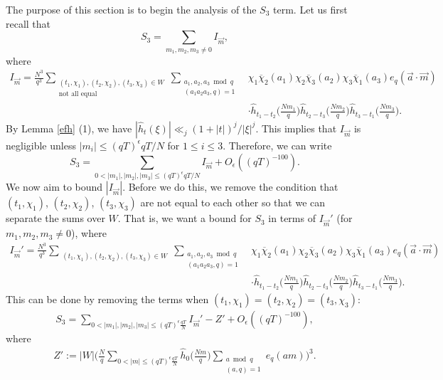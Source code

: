 \documentclass[12pt]{amsart}
\theoremstyle{definition}
\theoremstyle{plain}
\theoremstyle{remark}
\numberwithin{equation}{section}
\numberwithin{theorem}{section}
\numberwithin{equation}{section}
\begin{document}
	The purpose of this section is to begin the analysis of the $S_{3}$ term. Let us first recall that 
	\[S_{3}=\sum_{m_{1}, m_{2}, m_{3}\neq 0}I_{\overrightarrow{m}},\]
	where
	\begin{align*}I_{\overrightarrow{m}}=\frac{N^{3}}{q^{3}}\sum_{\substack{(t_1,\chi_1),(t_2,\chi_2),(t_3,\chi_3) \in W \\ \text{not all equal}}}\sum_{\substack{a_1,a_2,a_3 \bmod q \\ (a_1a_2a_3,q)=1}}&\chi_{1}\overline{\chi}_{2}(a_{1})
		\chi_{2}\overline{\chi}_{3}(a_{2})
		\chi_{3}\overline{\chi}_{1}(a_{3})
		e_q(\overrightarrow{a}\cdot\overrightarrow{m})
		\\
		&\cdot \hat{h}_{t_{1}-t_{2}}\bigg(\frac{Nm_{1}}{q}\bigg)\hat{h}_{t_{2}-t_{3}}\bigg(\frac{Nm_{2}}{q}\bigg)\hat{h}_{t_{3}-t_{1}}\bigg(\frac{Nm_{3}}{q}\bigg).
	\end{align*}
	By Lemma \ref{efh} (1), we have $|\hat{h}_{t}(\xi)|\ll_{j}(1+|t|)^{j}/|\xi|^{j}$. This implies that $I_{\overrightarrow{m}}$ is negligible unless $|m_{i}|\leq (qT)^{\epsilon}qT/N$ for $1\leq i \leq 3$. Therefore, we can write
	\[
	S_{3}=\sum_{0<|m_{1}|, |m_{2}|, |m_{3}|\leq (qT)^{\epsilon}qT/N}I_{\overrightarrow{m}}+O_{\epsilon}((qT)^{-100}).
	\]
	We now aim to bound $|I_{\overrightarrow{m}}|$. Before we do this, we remove the condition that $(t_1,\chi_1)$, $(t_2,\chi_2)$, $(t_3,\chi_3)$ are not equal to each other so that we can separate the sums over $W$. That is, we want a bound for $S_3$ in terms of $I_{\overrightarrow{m}}'$ (for $m_1,m_2,m_3 \neq 0$), where 
	\begin{align*}
		I_{\overrightarrow{m}}'=\frac{N^{3}}{q^{3}}\sum_{\substack{(t_1,\chi_1),(t_2,\chi_2),(t_3,\chi_3) \in W}}\sum_{\substack{a_1,a_2,a_3 \bmod q \\ (a_1a_2a_3,q)=1}}&\chi_{1}\overline{\chi}_{2}(a_{1})
		\chi_{2}\overline{\chi}_{3}(a_{2})
		\chi_{3}\overline{\chi}_{1}(a_{3}) e_q(\overrightarrow{a}\cdot\overrightarrow{m})
		\\
		&\cdot \hat{h}_{t_{1}-t_{2}}\bigg(\frac{Nm_{1}}{q}\bigg)\hat{h}_{t_{2}-t_{3}}\bigg(\frac{Nm_{2}}{q}\bigg)\hat{h}_{t_{3}-t_{1}}\bigg(\frac{Nm_{3}}{q}\bigg).
	\end{align*}
	This can be done by removing the terms when $(t_1,\chi_1)= (t_2,\chi_2) = (t_3,\chi_3)$:
	\begin{align*}
		S_3 = \sum_{0 < |m_1|,|m_2|,|m_3| \leq(qT)^{\epsilon} \frac{qT}{N}} I_{\overrightarrow{m}}' {-} Z'+O_{\epsilon}((qT)^{-100}),
	\end{align*}
	where
	\begin{align*}
		Z':=|W|\bigg(\frac{N}{q}\sum_{0 < |m|\leq(qT)^{\epsilon} \frac{qT}{N}} \hat{h}_{0}\bigg(\frac{Nm}{q}\bigg)\sum_{\substack{ a \bmod q \\ (a,q)=1}}e_q(am)\bigg)^{3}.
	\end{align*}
\end{document}
